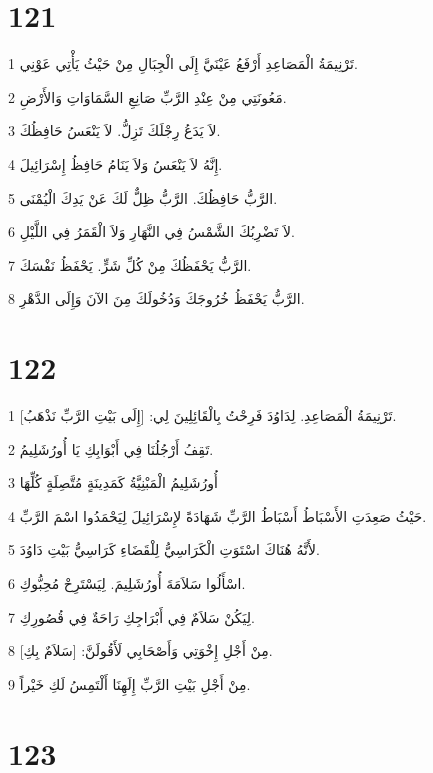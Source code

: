 \chapter{121}

\par 1 تَرْنِيمَةُ الْمَصَاعِدِ أَرْفَعُ عَيْنَيَّ إِلَى الْجِبَالِ مِنْ حَيْثُ يَأْتِي عَوْنِي.
\par 2 مَعُونَتِي مِنْ عِنْدِ الرَّبِّ صَانِعِ السَّمَاوَاتِ وَالأَرْضِ.
\par 3 لاَ يَدَعُ رِجْلَكَ تَزِلُّ. لاَ يَنْعَسُ حَافِظُكَ.
\par 4 إِنَّهُ لاَ يَنْعَسُ وَلاَ يَنَامُ حَافِظُ إِسْرَائِيلَ.
\par 5 الرَّبُّ حَافِظُكَ. الرَّبُّ ظِلٌّ لَكَ عَنْ يَدِكَ الْيُمْنَى.
\par 6 لاَ تَضْرِبُكَ الشَّمْسُ فِي النَّهَارِ وَلاَ الْقَمَرُ فِي اللَّيْلِ.
\par 7 الرَّبُّ يَحْفَظُكَ مِنْ كُلِّ شَرٍّ. يَحْفَظُ نَفْسَكَ.
\par 8 الرَّبُّ يَحْفَظُ خُرُوجَكَ وَدُخُولَكَ مِنَ الآنَ وَإِلَى الدَّهْرِ.

\chapter{122}

\par 1 تَرْنِيمَةُ الْمَصَاعِدِ. لِدَاوُدَ فَرِحْتُ بِالْقَائِلِينَ لِي: [إِلَى بَيْتِ الرَّبِّ نَذْهَبُ].
\par 2 تَقِفُ أَرْجُلُنَا فِي أَبْوَابِكِ يَا أُورُشَلِيمُ.
\par 3 أُورُشَلِيمُ الْمَبْنِيَّةُ كَمَدِينَةٍ مُتَّصِلَةٍ كُلِّهَا
\par 4 حَيْثُ صَعِدَتِ الأَسْبَاطُ أَسْبَاطُ الرَّبِّ شَهَادَةً لإِسْرَائِيلَ لِيَحْمَدُوا اسْمَ الرَّبِّ.
\par 5 لأَنَّهُ هُنَاكَ اسْتَوَتِ الْكَرَاسِيُّ لِلْقَضَاءِ كَرَاسِيُّ بَيْتِ دَاوُدَ.
\par 6 اسْأَلُوا سَلاَمَةَ أُورُشَلِيمَ. لِيَسْتَرِحْ مُحِبُّوكِ.
\par 7 لِيَكُنْ سَلاَمٌ فِي أَبْرَاجِكِ رَاحَةٌ فِي قُصُورِكِ.
\par 8 مِنْ أَجْلِ إِخْوَتِي وَأَصْحَابِي لَأَقُولَنَّ: [سَلاَمٌ بِكِ].
\par 9 مِنْ أَجْلِ بَيْتِ الرَّبِّ إِلَهِنَا أَلْتَمِسُ لَكِ خَيْراً.

\chapter{123}

